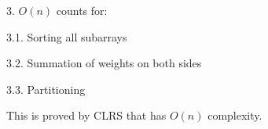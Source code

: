 \documentclass[11pt]{article}
\begin{document}
\begin{enumerate}
	\hspace{10mm} 3. $O(n)$ counts for:
	
	\hspace{15mm} 3.1. Sorting all subarrays 
	
	\hspace{15mm} 3.2. Summation of weights on both sides

	\hspace{15mm} 3.3. Partitioning
	 
	This is proved by CLRS that has $O(n)$ complexity.
	
	
	
	
	
	
	





































   
\end{enumerate}
\end{document}
